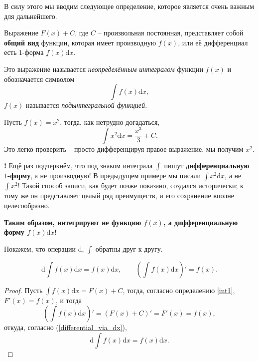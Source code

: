 В силу этого мы вводим следующее определение, которое является очень важным для дальнейшего.

\begin{definition}\label{int2}
    Выражение $F(x) + C$, где $C$ -- произвольная постоянная, представляет собой \textbf{общий вид} функции, которая имеет производную $f(x)$, или её дифференциал есть $1$-форма $f(x) \mathrm{d}x.$

    Это выражение называется \textit{неопределённым интегралом} функции $f(x)$ и обозначается символом
    \[
     \int f(x) \mathrm{d}x,
    \]
    $f(x)$ называется \textit{подынтегральной функцией.}
\end{definition}

\begin{example}
    Пусть $f(x) = x^2$, тогда, как нетрудно догадаться,
    \[
     \int x^2 \mathrm{d}x = \frac{x^3}{3} + C.
     \]
Это легко проверить -- просто дифференцируя правое выражение, мы получим $x^2.$
\end{example}

    
\begin{mydanger}{\bf{!}}
    Ещё раз подчеркнём, что под знаком интеграла $\int$ пишут \textbf{дифференциальную $1$-форму}, а не производную! В предыдущем примере мы писали $\int x^2 \mathrm{d}x$, а не $\int x^2$! Такой способ записи, как будет позже показано, создался исторически; к тому же он представляет целый ряд преимуществ, и его сохранение вполне целесообразно. 
\end{mydanger}

\textbf{Таким образом, интегрируют не функцию $f(x)$, а  дифференциальную 
форму $f(x)\mathrm{d}x$!}

Покажем, что операции $\mathrm{d}$, $\int$ обратны друг к другу.

\begin{lemma}
    \[
     \mathrm{d} \int f(x)\mathrm{d}x = f(x) \mathrm{d}x, \qquad \left( \int f(x) \mathrm{d}x \right)' = f(x).
    \]
\end{lemma}

\begin{proof}
    Пусть $\int f(x) \mathrm{d}x = F(x)+C$, тогда, согласно определению \ref{int1}, $F'(x) = f(x)$, и тогда
    \[
    \left(\int f(x) \mathrm{d}x \right)' =  (F(x) + C)' = F'(x)  = f(x), 
    \]
откуда, согласно (\ref{differential_via_dx}),
\[
 \mathrm{d} \int f(x)\mathrm{d}x = f(x) \mathrm{d}x.
\]
\end{proof}

